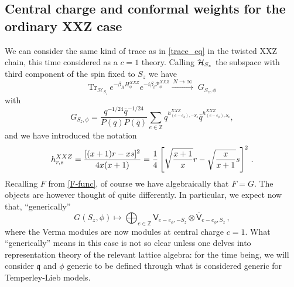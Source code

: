 \documentclass[a4paper,10pt]{article}
\newcommand{\q}{\mathfrak{q}}
\newcommand{\hubert}[1]{$\framebox{\tiny h}$\ \textbf{\texttt{{\color{blue}\footnotesize#1}}}}
\newcommand{\linnea}[1]{$\framebox{\tiny L}$\ \textbf{\texttt{{\color{red}\footnotesize#1}}}}
\newcommand{\Verma}[1]{\mathsf{V}_{#1}}
\newcommand{\Vermab}[1] {\overline{\mathsf{V}}_{#1}}
\begin{document}


\subsection{Central charge and conformal weights for the ordinary XXZ case}

We can consider the same kind of trace as in \eqref{trace_eq} %
 in the twisted XXZ chain, this time considered as a $c=1$ theory. %
Calling ${\cal H}_{S_z}$ the subspace with third component of the spin fixed to $S_z$ we have
%
\begin{equation}
\text{Tr}_{{\mathcal H}_{S_z}}\,e^{-\beta_R H^{XXZ}_\phi}e^{-i\beta_i {\mathcal P}^{XXZ}_\phi} \xrightarrow{\, N\to\infty\,}\; G_{S_z,\phi}  
 \end{equation}
with 
%
 \begin{equation}\label{G-func}
 G_{S_z,\phi} = \frac{q^{-1/24}\bar{q}^{-1/24}}{P(q)P(\bar{q})} \sum_{e \in \mathbb{Z}} q^{h^{XXZ}_{(e-e_\phi),-S_z}}\bar{q}^{h^{XXZ}_{(e-e_\phi),S_z}},
\end{equation}
%
and  we have introduced the notation %
%
\begin{equation}
h^{XXZ}_{r,s}={[(x+1)r-xs]^2\over 4x(x+1)}={1\over 4} \left[\sqrt{x+1\over x}r-\sqrt{x\over x+1}s\right]^2 \,.
\end{equation}
%
Recalling $F$ from \eqref{F-func}, of course we have algebraically that $F=G$. The objects are however thought of quite differently. In particular, we expect now that, ``generically''
%
\begin{equation}
G(S_z,\phi)\mapsto \bigoplus_{e\in\mathbb{Z}} \Verma{e-e_\phi,-S_z}\otimes\Vermab{e-e_\phi,S_z} \,,
\end{equation}
%
where the Verma modules are now modules at central charge $c=1$. What ``generically'' means in this case is not so clear unless one delves into representation theory of the relevant lattice algebra: for the time being, we will consider $\q$ and $\phi$ generic to be defined through what is considered generic for Temperley-Lieb models. 
\end{document}
